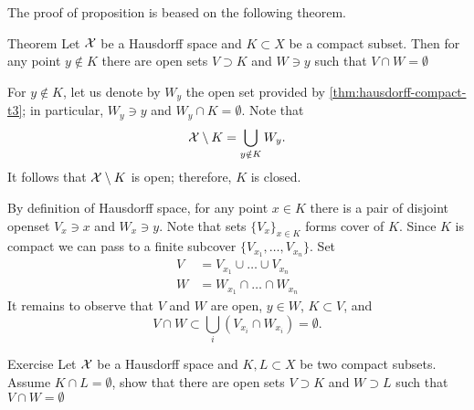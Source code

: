 The proof of proposition is beased on the following theorem.

\begin{thm}{Theorem}\label{thm:hausdorff-compact-t3}
Let $\mathcal{X}$ be a Hausdorff space and $K\subset X$ be a compact subset.
Then for any point $y\notin K$ there are open sets $V\supset K$ and $W\ni y$
such that $V\cap W=\emptyset$
\end{thm}

For $y\notin K$, let us denote by $W_y$ the open set provided by \ref{thm:hausdorff-compact-t3};
in particular, $W_y\ni y$ and $W_y\cap K=\emptyset$.
Note that 
\[\mathcal{X}\setminus K=\bigcup_{y\notin K} W_y.\]
It follows that $\mathcal{X}\setminus K$ is open; therefore, $K$ is closed.
\qeds


By definition of Hausdorff space,
for any point $x\in K$ there is a pair of disjoint openset $V_x\ni x$ and $W_x\ni y$.
Note that sets $\{V_x\}_{x\in K}$ forms cover of $K$.
Since $K$ is compact we can pass to a finite subcover $\{V_{x_1},\dots , V_{x_n}\}$.
Set 
\begin{align*}
V&=V_{x_1}\cup\dots \cup V_{x_n}
\\
W&=W_{x_1}\cap\dots \cap W_{x_n}
\end{align*}
It remains to observe that $V$ and $W$ are open, $y\in W$, $K\subset V$, and 
\[V\cap W\subset \bigcup_i(V_{x_i}\cap W_{x_i})=\emptyset.\]
\qedsf

\begin{thm}{Exercise}\label{ex:normal-hausdorff}
Let $\mathcal{X}$ be a Hausdorff space and $K,L\subset X$ be two compact subsets.
Assume $K\cap L=\emptyset$, show that there are open sets $V\supset K$ and $W\supset L$
such that $V\cap W=\emptyset$
\end{thm}




